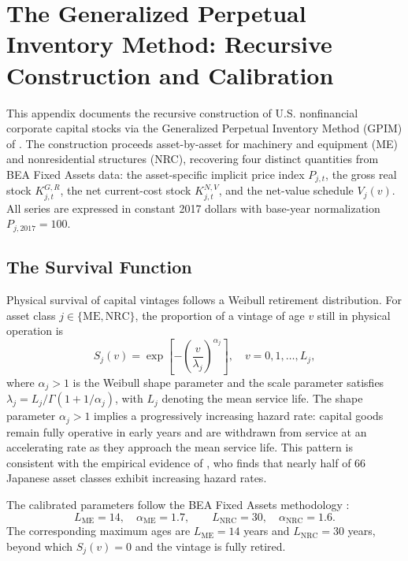 \section{The Generalized Perpetual Inventory Method: Recursive
	Construction and Calibration}
\label{app:A1:gpim_construction}

This appendix documents the recursive construction of U.S.
nonfinancial corporate capital stocks via the Generalized Perpetual
Inventory Method (GPIM) of \citet[App.~6.5]{Shaikh2016}. The
construction proceeds asset-by-asset for machinery and equipment
(ME) and nonresidential structures (NRC), recovering four distinct
quantities from BEA Fixed Assets data: the asset-specific implicit
price index $P_{j,t}$, the gross real stock $K^{G,R}_{j,t}$, the
net current-cost stock $K^{N,V}_{j,t}$, and the net-value schedule
$V_j(v)$. All series are expressed in constant 2017 dollars with
base-year normalization $P_{j,2017} = 100$.

\subsection{The Survival Function}
\label{app:A1:survival}

Physical survival of capital vintages follows a Weibull retirement
distribution. For asset class $j \in \{\text{ME}, \text{NRC}\}$,
the proportion of a vintage of age $v$ still in physical operation
is
\begin{equation}
	S_j(v) = \exp\!\left[
	-\left( \frac{v}{\lambda_j} \right)^{\alpha_j}
	\right],
	\quad v = 0, 1, \ldots, L_j,
	\label{eq:A1:survival}
\end{equation}
where $\alpha_j > 1$ is the Weibull shape parameter and the scale
parameter satisfies $\lambda_j = L_j / \Gamma(1 + 1/\alpha_j)$,
with $L_j$ denoting the mean service life. The shape parameter
$\alpha_j > 1$ implies a progressively increasing hazard rate:
capital goods remain fully operative in early years and are
withdrawn from service at an accelerating rate as they approach
the mean service life. This pattern is consistent with the
empirical evidence of \citet{Nomura2005}, who finds that nearly
half of 66 Japanese asset classes exhibit increasing hazard rates.

The calibrated parameters follow the BEA Fixed Assets methodology
\citep{Fraumeni1997}:
\begin{equation}
	L_{\text{ME}} = 14, \quad \alpha_{\text{ME}} = 1.7,
	\qquad
	L_{\text{NRC}} = 30, \quad \alpha_{\text{NRC}} = 1.6.
	\label{eq:A1:calibration_survival}
\end{equation}
The corresponding maximum ages are $L_{\text{ME}} = 14$ years and
$L_{\text{NRC}} = 30$ years, beyond which $S_j(v) = 0$ and the
vintage is fully retired.

